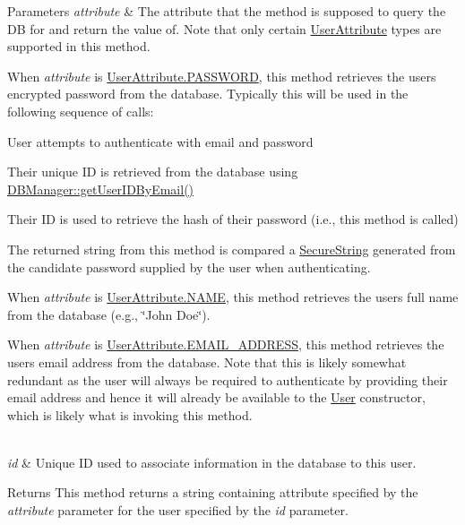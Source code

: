 \begin{DoxyParams}{Parameters}
{\em attribute} & The attribute that the method is supposed to query the DB for and return the value of. Note that only certain \hyperlink{enumcom_1_1activitytracker_1_1_user_attribute}{User\+Attribute} types are supported in this method.
\begin{DoxyItemize}
\item When {\itshape attribute} is \hyperlink{enumcom_1_1activitytracker_1_1_user_attribute_aa893eac0362a28e73a599ce1ba141d40}{User\+Attribute.\+P\+A\+S\+S\+W\+O\+RD}, this method retrieves the user\textquotesingle{}s encrypted password from the database. Typically this will be used in the following sequence of calls\+:
\begin{DoxyEnumerate}
\item User attempts to authenticate with email and password
\item Their unique ID is retrieved from the database using \hyperlink{classcom_1_1activitytracker_1_1_d_b_manager_a195dcdeabdd00facb19d720976dd3f53}{D\+B\+Manager\+::get\+User\+I\+D\+By\+Email()}
\item Their ID is used to retrieve the hash of their password (i.\+e., this method is called)
\item The returned string from this method is compared a \hyperlink{classcom_1_1activitytracker_1_1_secure_string}{Secure\+String} generated from the candidate password supplied by the user when authenticating.
\end{DoxyEnumerate}
\item When {\itshape attribute} is \hyperlink{enumcom_1_1activitytracker_1_1_user_attribute_aac51a5dfcaaa9e5304d37d74fc888af4}{User\+Attribute.\+N\+A\+ME}, this method retrieves the user\textquotesingle{}s full name from the database (e.\+g., \char`\"{}\+John Doe\char`\"{}).
\item When {\itshape attribute} is \hyperlink{enumcom_1_1activitytracker_1_1_user_attribute_a8b9fa2ebf911262dfa24c683ff2a3b9c}{User\+Attribute.\+E\+M\+A\+I\+L\+\_\+\+A\+D\+D\+R\+E\+SS}, this method retrieves the user\textquotesingle{}s email address from the database. Note that this is likely somewhat redundant as the user will always be required to authenticate by providing their email address and hence it will already be available to the \hyperlink{classcom_1_1activitytracker_1_1_user}{User} constructor, which is likely what is invoking this method. 
\end{DoxyItemize}\\
\hline
{\em id} & Unique ID used to associate information in the database to this user.\\
\hline
\end{DoxyParams}
\begin{DoxyReturn}{Returns}
This method returns a string containing attribute specified by the {\itshape attribute} parameter for the user specified by the {\itshape id} parameter. 
\end{DoxyReturn}


